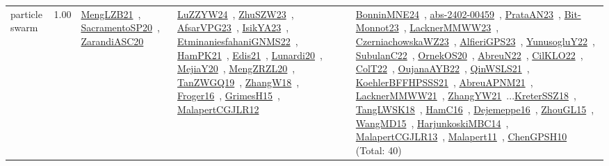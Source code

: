 {\begin{longtable}{p{3cm}r>{\raggedright\arraybackslash}p{6cm}>{\raggedright\arraybackslash}p{6cm}>{\raggedright\arraybackslash}p{8cm}}
\index{particle swarm}\index{Algorithms!particle swarm}particle swarm &  1.00 & \href{../works/MengLZB21.pdf}{MengLZB21}~\cite{MengLZB21}, \href{../works/SacramentoSP20.pdf}{SacramentoSP20}~\cite{SacramentoSP20}, \href{../works/ZarandiASC20.pdf}{ZarandiASC20}~\cite{ZarandiASC20} & \href{../works/LuZZYW24.pdf}{LuZZYW24}~\cite{LuZZYW24}, \href{../works/ZhuSZW23.pdf}{ZhuSZW23}~\cite{ZhuSZW23}, \href{../works/AfsarVPG23.pdf}{AfsarVPG23}~\cite{AfsarVPG23}, \href{../works/IsikYA23.pdf}{IsikYA23}~\cite{IsikYA23}, \href{../works/EtminaniesfahaniGNMS22.pdf}{EtminaniesfahaniGNMS22}~\cite{EtminaniesfahaniGNMS22}, \href{../works/HamPK21.pdf}{HamPK21}~\cite{HamPK21}, \href{../works/Edis21.pdf}{Edis21}~\cite{Edis21}, \href{../works/Lunardi20.pdf}{Lunardi20}~\cite{Lunardi20}, \href{../works/MejiaY20.pdf}{MejiaY20}~\cite{MejiaY20}, \href{../works/MengZRZL20.pdf}{MengZRZL20}~\cite{MengZRZL20}, \href{../works/TanZWGQ19.pdf}{TanZWGQ19}~\cite{TanZWGQ19}, \href{../works/ZhangW18.pdf}{ZhangW18}~\cite{ZhangW18}, \href{../works/Froger16.pdf}{Froger16}~\cite{Froger16}, \href{../works/GrimesH15.pdf}{GrimesH15}~\cite{GrimesH15}, \href{../works/MalapertCGJLR12.pdf}{MalapertCGJLR12}~\cite{MalapertCGJLR12} & \href{../works/BonninMNE24.pdf}{BonninMNE24}~\cite{BonninMNE24}, \href{../works/abs-2402-00459.pdf}{abs-2402-00459}~\cite{abs-2402-00459}, \href{../works/PrataAN23.pdf}{PrataAN23}~\cite{PrataAN23}, \href{../works/Bit-Monnot23.pdf}{Bit-Monnot23}~\cite{Bit-Monnot23}, \href{../works/LacknerMMWW23.pdf}{LacknerMMWW23}~\cite{LacknerMMWW23}, \href{../works/CzerniachowskaWZ23.pdf}{CzerniachowskaWZ23}~\cite{CzerniachowskaWZ23}, \href{../works/AlfieriGPS23.pdf}{AlfieriGPS23}~\cite{AlfieriGPS23}, \href{../works/YunusogluY22.pdf}{YunusogluY22}~\cite{YunusogluY22}, \href{../works/SubulanC22.pdf}{SubulanC22}~\cite{SubulanC22}, \href{../works/OrnekOS20.pdf}{OrnekOS20}~\cite{OrnekOS20}, \href{../works/AbreuN22.pdf}{AbreuN22}~\cite{AbreuN22}, \href{../works/CilKLO22.pdf}{CilKLO22}~\cite{CilKLO22}, \href{../works/ColT22.pdf}{ColT22}~\cite{ColT22}, \href{../works/OujanaAYB22.pdf}{OujanaAYB22}~\cite{OujanaAYB22}, \href{../works/QinWSLS21.pdf}{QinWSLS21}~\cite{QinWSLS21}, \href{../works/KoehlerBFFHPSSS21.pdf}{KoehlerBFFHPSSS21}~\cite{KoehlerBFFHPSSS21}, \href{../works/AbreuAPNM21.pdf}{AbreuAPNM21}~\cite{AbreuAPNM21}, \href{../works/LacknerMMWW21.pdf}{LacknerMMWW21}~\cite{LacknerMMWW21}, \href{../works/ZhangYW21.pdf}{ZhangYW21}~\cite{ZhangYW21}...\href{../works/KreterSSZ18.pdf}{KreterSSZ18}~\cite{KreterSSZ18}, \href{../works/TangLWSK18.pdf}{TangLWSK18}~\cite{TangLWSK18}, \href{../works/HamC16.pdf}{HamC16}~\cite{HamC16}, \href{../works/Dejemeppe16.pdf}{Dejemeppe16}~\cite{Dejemeppe16}, \href{../works/ZhouGL15.pdf}{ZhouGL15}~\cite{ZhouGL15}, \href{../works/WangMD15.pdf}{WangMD15}~\cite{WangMD15}, \href{../works/HarjunkoskiMBC14.pdf}{HarjunkoskiMBC14}~\cite{HarjunkoskiMBC14}, \href{../works/MalapertCGJLR13.pdf}{MalapertCGJLR13}~\cite{MalapertCGJLR13}, \href{../works/Malapert11.pdf}{Malapert11}~\cite{Malapert11}, \href{../works/ChenGPSH10.pdf}{ChenGPSH10}~\cite{ChenGPSH10} (Total: 40)\\

\end{longtable}}
